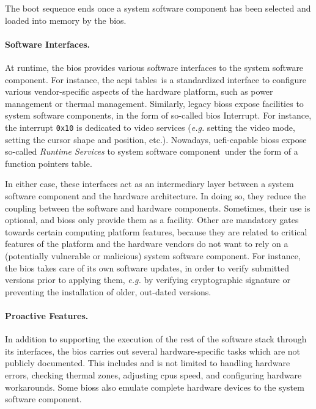 The boot sequence ends once a system software component has been selected and
loaded into memory by the \ac{bios}.

\paragraph{Software Interfaces.}
At runtime, the \ac{bios} provides various software interfaces to the system
software component.
%
For instance, the \ac{acpi} tables\,\cite{uefi2017acpi,duflot2010acpi} is a
standardized interface to configure various vendor-specific aspects of the
hardware platform, such as power management or thermal management.
%
Similarly, legacy \acp{bios} expose facilities to system software components, in
the form of so-called \ac{bios} Interrupt.
%
For instance, the interrupt \texttt{0x10} is dedicated to video services
(\emph{e.g.} setting the video mode, setting the cursor shape and position,
etc.).
%
Nowadays, \ac{uefi}-capable \acp{bios} expose so-called \emph{Runtime Services}
to system software component\,\cite[Chapter 5]{zimmer2017uefi} under the form of
a function pointers table.

In either case, these interfaces act as an intermediary layer between a system
software component and the hardware architecture.
%
In doing so, they reduce the coupling between the software and hardware
components.
%
Sometimes, their use is optional, and \acp{bios} only provide them as a
facility.
%
Other are mandatory gates towards certain computing platform features, because
they are related to critical features of the platform and the hardware vendors
do not want to rely on a (potentially vulnerable or malicious) system software
component.
%
For instance, the \ac{bios} takes care of its own software updates, in order to
verify submitted versions prior to applying them, \emph{e.g.} by verifying
cryptographic signature or preventing the installation of older, out-dated
versions.

\paragraph{Proactive Features.}
%
In addition to supporting the execution of the rest of the software stack
through its interfaces, the \ac{bios} carries out several hardware-specific
tasks which are not publicly documented.
%
This includes and is not limited to handling hardware errors, checking thermal
zones, adjusting \acp{cpu} speed, and configuring hardware workarounds.
%
Some \acp{bios} also emulate complete hardware devices to the system software
component.

